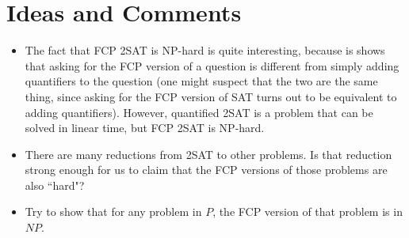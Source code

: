 \documentclass[11pt]{article}
\begin{document}
\section{Ideas and Comments}

\begin{itemize}
\item The fact that FCP 2SAT is NP-hard is quite interesting, because is shows that asking for the FCP version of a question is different from simply adding quantifiers to the question (one might suspect that the two are the same thing, since asking for the FCP version of SAT turns out to be equivalent to adding quantifiers). However, quantified 2SAT is a problem that can be solved in linear time, but FCP 2SAT is NP-hard.
\item There are many reductions from 2SAT to other problems. Is that reduction strong enough for us to claim that the FCP versions of those problems are also ``hard"?
\item Try to show that for any problem in $P$, the FCP version of that problem is in $NP$.
\end{itemize}
\end{document}
